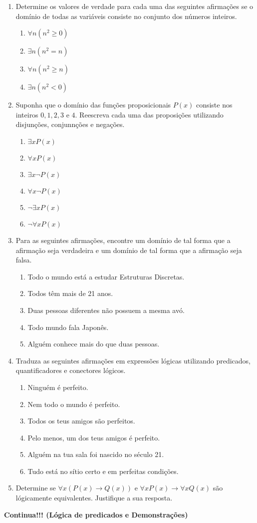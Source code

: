 \begin{enumerate}
	\item Determine os valores de verdade para cada uma das seguintes afirmações se o domínio de todas as variáveis consiste
	no conjunto dos números inteiros.
	\begin{enumerate}
		\item $\forall n(n^2 \geq 0)$ \item $\exists n (n^2 = n)$ \item $\forall n(n^2 \geq n)$ \item $\exists n(n^2 < 0)$
	\end{enumerate}
	
	\item Suponha que o domínio das funções proposicionais $P(x)$ consiste nos inteiros $0, 1, 2, 3$ e $4$. Reescreva cada uma
	das proposições utilizando disjunções, conjunnções e negações.
	\begin{enumerate}
		\item $\exists xP(x)$ \item $\forall xP(x)$ \item $\exists x \lnot P(x)$ \item $\forall x \lnot P(x)$
		\item $\lnot \exists xP(x)$ \item $\lnot \forall x P(x)$
	\end{enumerate}
	
	\item Para as seguintes afirmações, encontre um domínio de tal forma que a afirmação seja verdadeira e um domínio de tal forma
	que a afirmação seja falsa.
	\begin{enumerate}
		\item Todo o mundo está a estudar Estruturas Discretas.
		\item Todos têm mais de 21 anos.
		\item Duas pessoas diferentes não possuem a mesma avó.
		\item Todo mundo fala Japonês.
		\item Alguém conhece mais do que duas pessoas.
	\end{enumerate}
	
	\item Traduza as seguintes afirmações em expressões lógicas utilizando predicados, quantificadores e conectores lógicos.
	\begin{enumerate}
	  \item Ninguém é perfeito.
	  \item Nem todo o mundo é perfeito.
	  \item Todos os teus amigos são perfeitos.
	  \item Pelo menos, um dos teus amigos é perfeito.
	  \item Alguém na tua sala foi nascido no século 21.
	  \item Tudo está no sítio certo e em perfeitas condições.
	\end{enumerate}
	
	\item Determine se $\forall x(P(x) \to Q(x))$ e $\forall xP(x) \to \forall xQ(x)$ são lógicamente equivalentes. Justifique
	a sua resposta.
\end{enumerate}

\vspace*{2em}
\begin{center}\textbf{Continua!!! (Lógica de predicados e Demonstrações)}\end{center}